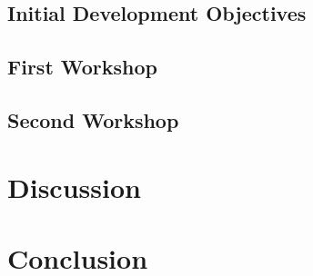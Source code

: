 \documentclass{sigchi}
\begin{document}
\subsection{Initial Development Objectives}
\subsection{First Workshop}
\subsection{Second Workshop}
\section{Discussion}
\section{Conclusion}
\balance




\end{document}
